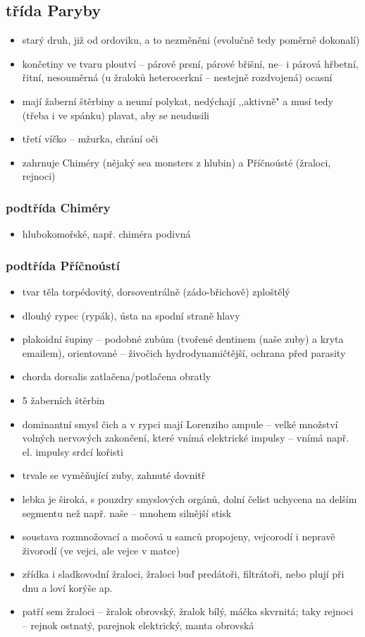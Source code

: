 \documentclass{article}
\begin{document}
\subsection{třída Paryby}
\begin{itemize}
  \item starý druh, již od ordoviku, a to nezměněni (evolučně tedy poměrně dokonalí)
  \item končetiny ve tvaru ploutví -- párové prsní, párové břišní, ne-- i párová hřbetní, řitní, nesouměrná (u žraloků heterocerkní -- nestejně rozdvojená) ocasní
  \item mají žaberní štěrbiny a neumí polykat, nedýchají ,,aktivně" a musí tedy (třeba i ve spánku) plavat, aby se neudusili
  \item třetí víčko -- mžurka, chrání oči
  \item zahrnuje Chiméry (nějaký sea monsters z hlubin) a Příčnoústé (žraloci, rejnoci)
\end{itemize}

\subsubsection{podtřída Chiméry}
\begin{itemize}
  \item hlubokomořské, např. chiméra podivná
\end{itemize}

\subsubsection{podtřída Příčnoústí}
\begin{itemize}
  \item tvar těla torpédovitý, dorsoventrálně (zádo-břichově) zploštělý
  \item dlouhý rypec (rypák), ústa na spodní straně hlavy
  \item plakoidní šupiny -- podobné zubům (tvořené dentinem (naše zuby) a kryta emailem), orientované -- živočich hydrodynamičtější, ochrana před parasity
  \item chorda dorsalis zatlačena/potlačena obratly
  \item 5 žaberních štěrbin
  \item dominantní smysl čich a v rypci mají Lorenziho ampule -- velké množství volných nervových zakončení, které vnímá elektrické impulsy -- vnímá např. el. impulsy srdcí kořisti
  \item trvale se vyměňující zuby, zahnuté dovnitř
  \item lebka je široká, s pouzdry smyslových orgánů, dolní čelist uchycena na delším segmentu než např. naše -- mnohem silnější stisk
  \item soustava rozmnožovací a močová u samců propojeny, vejcorodí i nepravě živorodí (ve vejci, ale vejce v matce)
  \item zřídka i sladkovodní žraloci, žraloci buď predátoři, filtrátoři, nebo plují při dnu a loví korýše ap.
  \item patří sem žraloci -- žralok obrovský, žralok bílý, máčka skvrnitá; taky rejnoci -- rejnok ostnatý, parejnok elektrický, manta obrovská
\end{itemize}
\end{document}
